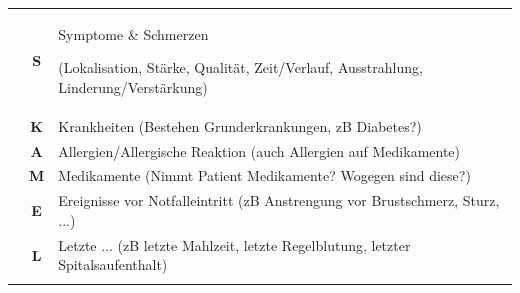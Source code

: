 \vfill
\restoregeometry\pagestyle{fancy}






    	








{}
{}
{%
\begin{minipage}{\linewidth}
\FontTableBase
{\sffamily\FontTableBase\CorrectionItemizeBox\renewcommand{\itemhook}{%
  \setlength{\itemsep}{0.005\baselineskip}
  \setlength{\leftmargin}{1.4em}
  \setlength{\labelwidth}{0.9em}
}
\begin{tabulary}{\linewidth}[H]{lCL}
\toprule\addlinespace
{}
 &
{\sffamily\textbf S}
 &
Symptome \& Schmerzen 

{\tiny(Lokalisation, Stärke,  Qualität, Zeit/Verlauf, 
 Ausstrahlung, Linderung/Verstärkung)}
\\\addlinespace
 &
{\sffamily\textbf K}
 &
Krankheiten {\tiny(Bestehen Grunderkrankungen, zB
Diabetes?)}
\\\addlinespace
 &
{\sffamily\textbf A}
 &
Allergien/Allergische Reaktion (auch
Allergien auf Medikamente)
\\\addlinespace
 &
 {\sffamily\textbf M}
 &
Medikamente {\tiny(Nimmt Patient Medikamente?
Wogegen sind diese?)}
\\\addlinespace
 &
 {\sffamily\textbf E}
 &
Ereignisse vor Notfalleintritt {\tiny(zB
Anstrengung vor Brustschmerz, Sturz, ...)}
\\\addlinespace
 &
 {\sffamily\textbf L}
 &
Letzte ... (zB letzte Mahlzeit, letzte
Regelblutung, letzter Spitalsaufenthalt)
\\\addlinespace\midrule\addlinespace


\end{tabulary}}
\end{minipage}}
